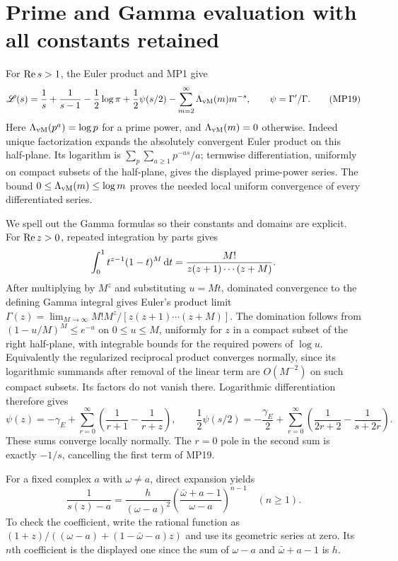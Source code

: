 \documentclass[11pt]{article}
\begin{document}
\section{Prime and Gamma evaluation with all constants retained}
For $\operatorname{Re} s>1$, the Euler product and MP1 give
\begin{equation}
 \mathscr L(s)=\frac1s+\frac1{s-1}-\frac12\log\pi
           +\frac12\psi(s/2)-\sum_{m=2}^\infty\Lambda_{\mathrm{vM}}(m)m^{-s},
 \qquad \psi=\Gamma'/\Gamma.\tag{MP19}
\end{equation}
Here $\Lambda_{\mathrm{vM}}(p^a)=\log p$ for a prime power, and $\Lambda_{\mathrm{vM}}(m)=0$ otherwise.
Indeed unique factorization expands the absolutely convergent Euler
product on this half-plane. Its logarithm is
$\sum_p\sum_{a\geq1}p^{-as}/a$; termwise differentiation, uniformly
on compact subsets of the half-plane, gives the displayed prime-power
series. The bound $0\leq\Lambda_{\mathrm{vM}}(m)\leq\log m$ proves the needed local
uniform convergence of every differentiated series.

We spell out the Gamma formulas so their constants and domains are
explicit. For $\operatorname{Re} z>0$, repeated integration by parts gives
\[
 \int_0^1t^{z-1}(1-t)^M\,\mathrm d t
       =\frac{M!}{z(z+1)\cdots(z+M)}.
\]
After multiplying by $M^z$ and substituting $u=Mt$, dominated
convergence to the defining Gamma integral gives Euler's product limit
$\Gamma(z)=\lim_{M\to\infty}M!M^z/[z(z+1)\cdots(z+M)]$.
The domination follows from $(1-u/M)^M\leq e^{-u}$ on $0\leq u\leq M$,
uniformly for $z$ in a compact subset of the right half-plane, with
integrable bounds for the required powers of $\log u$.
Equivalently the regularized reciprocal product converges normally,
since its logarithmic summands after removal of the linear term are
$O(M^{-2})$ on such compact subsets. Its factors do not vanish there.
Logarithmic differentiation therefore gives
\begin{equation}
 \psi(z)=-\gamma_E+\sum_{r=0}^\infty
                   \left(\frac1{r+1}-\frac1{r+z}\right),
 \qquad
 \frac12\psi(s/2)=-\frac{\gamma_E}2+
       \sum_{r=0}^\infty\left(\frac1{2r+2}-\frac1{s+2r}\right).
 \tag{MP20}
\end{equation}
These sums converge locally normally. The $r=0$ pole in the second
sum is exactly $-1/s$, cancelling the first term of MP19.

For a fixed complex $a$ with $\omega\ne a$, direct expansion yields
\begin{equation}
 [z^n]\frac1{s(z)-a}
 =\frac h{(\omega-a)^2}
       \left(\frac{\bar\omega+a-1}{\omega-a}\right)^{n-1}
 \quad(n\geq1).\tag{MP21}
\end{equation}
To check the coefficient, write the rational function as
$(1+z)/((\omega-a)+(1-\bar\omega-a)z)$ and use its geometric series
at zero. Its $n$th coefficient is the displayed one since the sum of
$\omega-a$ and $\bar\omega+a-1$ is $h$.
\end{document}
